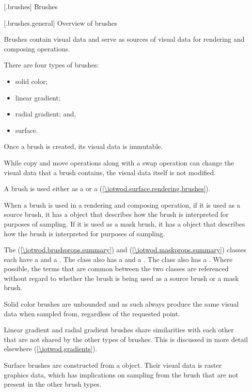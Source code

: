 
 [\iotwod.brushes] {Brushes}

 [\iotwod.brushes.general] {Overview of brushes}

\pnum
Brushes contain visual data and serve as sources of visual data for rendering and composing operations.

\pnum
There are four types of brushes:
\begin{itemize}
	\item solid color;
	\item linear gradient;
	\item radial gradient; and,
	\item surface.
\end{itemize}

\pnum
Once a brush is created, its visual data is immutable.

\pnum
\begin{note}
While copy and move operations along with a swap operation can change the visual data that a brush contains, the visual data itself is not modified.
\end{note}

\pnum
A brush is used either as a  or a  (\ref{\iotwod.surface.rendering.brushes}).

\pnum
When a brush is used in a rendering and composing operation, if it is used as a source brush, it has a  object that describes how the brush is interpreted for purposes of sampling. If it is used as a mask brush, it has a  object that describes how the brush is interpreted for purposes of sampling.

\pnum
The  (\ref{\iotwod.brushprops.summary}) and  (\ref{\iotwod.maskprops.summary}) classes each have a  and a . The  class also has a  and a . The  class also has a . Where possible, the terms that are common between the two classes are referenced without regard to whether the brush is being used as a source brush or a mask brush.

\pnum
Solid color brushes are unbounded and as such always produce the same visual data when sampled from, regardless of the requested point.

\pnum
Linear gradient and radial gradient brushes share similarities with each other that are not shared by the other types of brushes. This is discussed in more detail elsewhere (\ref{\iotwod.gradients}).

\pnum
Surface brushes are constructed from a  object. Their visual data is raster graphics data, which has implications on sampling from the brush that are not present in the other brush types.

\addtocounter{SectionDepthBase}{1}





%

\addtocounter{SectionDepthBase}{-1}
